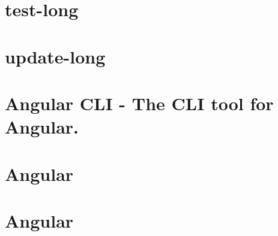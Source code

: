\documentclass[twoside]{book}
\newcommand{\+}{\discretionary{\mbox{\scriptsize$\hookleftarrow$}}{}{}}
\begin{document}
\chapter{test-\/long}
\label{md__c___users_vaishnavi_jadhav__desktop__developer_code_mean_stack_example_client_node_modules__angular_cli_commands_test_long}

\chapter{update-\/long}
\label{md__c___users_vaishnavi_jadhav__desktop__developer_code_mean_stack_example_client_node_modules__378ecdbb39a8024a81706f30ad08c435}

\chapter{Angular CLI -\/ The CLI tool for Angular.}
\label{md__c___users_vaishnavi_jadhav__desktop__developer_code_mean_stack_example_client_node_modules__angular_cli__r_e_a_d_m_e}

\chapter{Angular}
\label{md__c___users_vaishnavi_jadhav__desktop__developer_code_mean_stack_example_client_node_modules__angular_common__r_e_a_d_m_e}

\chapter{Angular}
\label{md__c___users_vaishnavi_jadhav__desktop__developer_code_mean_stack_example_client_node_modules__angular_compiler__r_e_a_d_m_e}

\end{document}
